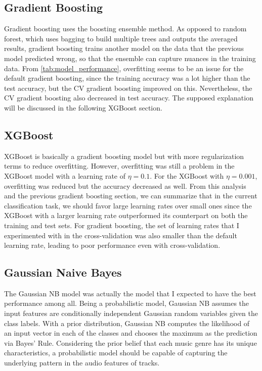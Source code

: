 \documentclass{article}
\begin{document}
\subsection{Gradient Boosting}

Gradient boosting uses the boosting ensemble method. As opposed to random forest, which uses bagging to build multiple trees and outputs the averaged results, gradient boosting trains another model on the data that the previous model predicted wrong, so that the ensemble can capture nuances in the training data. From \autoref{tab:model_performance}, overfitting seems to be an issue for the default gradient boosting, since the training accuracy was a lot higher than the test accuracy, but the CV gradient boosting improved on this. Nevertheless, the CV gradient boosting also decreased in test accuracy. The supposed explanation will be discussed in the following XGBoost section.

\subsection{XGBoost}

XGBoost is basically a gradient boosting model but with more regularization terms to reduce overfitting. However, overfitting was still a problem in the XGBoost model with a learning rate of \(\eta=0.1\). For the XGBoost with \(\eta=0.001\), overfitting was reduced but the accuracy decreased as well. From this analysis and the previous gradient boosting section, we can summarize that in the current classification task, we should favor large learning rates over small ones since the XGBoost with a larger learning rate outperformed its counterpart on both the training and test sets. For gradient boosting, the set of learning rates that I experimented with in the cross-validation was also smaller than the default learning rate, leading to poor performance even with cross-validation.

\subsection{Gaussian Naive Bayes}

The Gaussian NB model was actually the model that I expected to have the best performance among all. Being a probabilistic model, Gaussian NB assumes the input features are conditionally independent Gaussian random variables given the class labels. With a prior distribution, Gaussian NB computes the likelihood of an input vector in each of the classes and chooses the maximum as the prediction via Bayes' Rule. Considering the prior belief that each music genre has its unique characteristics, a probabilistic model should be capable of capturing the underlying pattern in the audio features of tracks.
\end{document}
